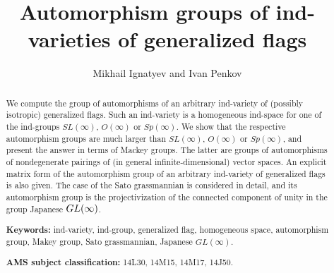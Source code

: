 \documentclass[11pt, a4paper]{article}
\begin{document}

\newcommand{\JSpec}[1]{\mathrm{JSpec}\,{#1}}
\newcommand{\PSpec}[1]{\mathrm{PSpec}\,{#1}}
\newcommand{\APbr}[1]{\mathrm{span}\{#1\}}
\newcommand{\APbre}[1]{\langle #1\rangle}
\newcommand{\APro}[1]{\setcounter{AP}{#1}\Roman{AP}}\newcommand{\apro}[1]{{\rm\setcounter{AP}{#1}\roman{AP}}}
\newcommand{\ot}{\xleftarrow[]{}}



\author{Mikhail Ignatyev and Ivan Penkov}%
\date{}
\title{Automorphism groups of ind-varieties of generalized flags}\maketitle
\begin{abstract} 
We compute the group of automorphisms of an arbitrary ind-variety of (possibly isotropic) generalized flags. Such an ind-variety is a homogeneous ind-space for one of the ind-groups $SL(\infty)$, $O(\infty)$ or $Sp(\infty)$. We show that the respective automorphism groups are much larger than $SL(\infty)$, $O(\infty)$ or $Sp(\infty)$, and present the answer in terms of Mackey groups. The latter are groups of automorphisms of nondegenerate  pairings of (in general infinite-dimensional) vector spaces. An explicit matrix form of the automorphism group of an arbitrary ind-variety of generalized flags  is also given. The case of the Sato grassmannian is considered in detail, and its automorphism group is the projectivization of the connected component of unity in the group Japanese $GL(\infty)$.   %

{\bf Keywords:} ind-variety, ind-group, generalized flag, homogeneous space, automorphism group, Makey group, Sato grassmannian, Japanese $GL(\infty)$.

{\bf AMS subject classification:} 14L30, 14M15, 14M17, 14J50. 
\end{abstract}
\end{document}
